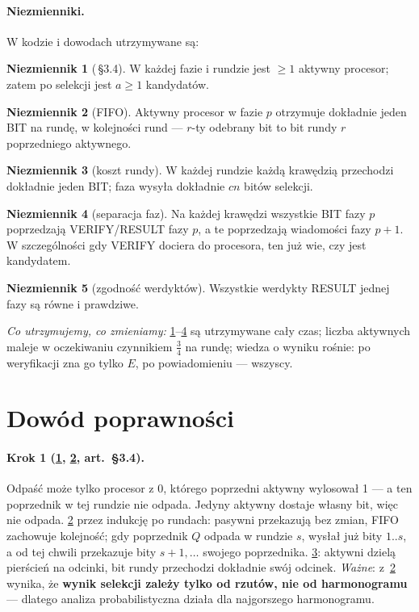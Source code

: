 \documentclass[11pt,a4paper]{article}
\theoremstyle{definition}
\newtheorem{niezm}{Niezmiennik}
\newcommand{\msg}[1]{\textsf{\small #1}}
\begin{document}
\paragraph{Niezmienniki.} W kodzie i dowodach utrzymywane są:
\begin{niezm}[\,§3.4]\label{n:aktywny}
W każdej fazie i rundzie jest $\ge1$ aktywny procesor; zatem po selekcji jest $a\ge1$ kandydatów.
\end{niezm}
\begin{niezm}[FIFO]\label{n:fifo}
Aktywny procesor w fazie $p$ otrzymuje dokładnie jeden \msg{BIT} na rundę, w kolejności rund —
$r$-ty odebrany bit to bit rundy $r$ poprzedniego aktywnego.
\end{niezm}
\begin{niezm}[koszt rundy]\label{n:runda}
W każdej rundzie każdą krawędzią przechodzi dokładnie jeden \msg{BIT}; faza wysyła dokładnie $cn$ bitów selekcji.
\end{niezm}
\begin{niezm}[separacja faz]\label{n:separacja}
Na każdej krawędzi wszystkie \msg{BIT} fazy $p$ poprzedzają \msg{VERIFY}/\msg{RESULT} fazy $p$, a te
poprzedzają wiadomości fazy $p+1$. W szczególności gdy \msg{VERIFY} dociera do procesora, ten już wie,
czy jest kandydatem.
\end{niezm}
\begin{niezm}[zgodność werdyktów]\label{n:werdykt}
Wszystkie werdykty \msg{RESULT} jednej fazy są równe i prawdziwe.
\end{niezm}

\noindent\emph{Co utrzymujemy, co zmieniamy:} \ref{n:aktywny}–\ref{n:separacja} są utrzymywane cały czas;
liczba aktywnych maleje w oczekiwaniu czynnikiem $\tfrac34$ na rundę; wiedza o wyniku rośnie:
po weryfikacji zna go tylko $E$, po powiadomieniu — wszyscy.

\section{Dowód poprawności}

\paragraph{Krok 1 (\ref{n:aktywny}, \ref{n:fifo}, art.\ §3.4).} Odpaść może tylko procesor z 0, którego
poprzedni aktywny wylosował 1 — a ten poprzednik w tej rundzie nie odpada. Jedyny aktywny dostaje własny
bit, więc nie odpada. \ref{n:fifo} przez indukcję po rundach: pasywni przekazują bez zmian, FIFO zachowuje
kolejność; gdy poprzednik $Q$ odpada w rundzie $s$, wysłał już bity $1..s$, a od tej chwili przekazuje
bity $s{+}1,\dots$ swojego poprzednika. \ref{n:runda}: aktywni dzielą pierścień na odcinki, bit rundy
przechodzi dokładnie swój odcinek. \emph{Ważne}: z~\ref{n:fifo} wynika, że \textbf{wynik selekcji zależy tylko od
rzutów, nie od harmonogramu} — dlatego analiza probabilistyczna działa dla najgorszego harmonogramu.
\end{document}
